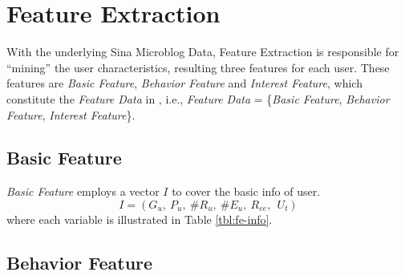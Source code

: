 

\section{Feature Extraction}
\label{sec:fe}

With the underlying Sina Microblog Data, Feature Extraction is responsible for ``mining'' the user characteristics, resulting three features for each user.
These features are \textit{Basic Feature}, \textit{Behavior Feature} and \textit{Interest Feature}, which constitute the \textit{Feature Data} in \sys{}, i.e., \textit{Feature Data} = \{\textit{Basic Feature}, \textit{Behavior Feature}, \textit{Interest Feature}\}.

\subsection{Basic Feature}

\textit{Basic Feature} employs a vector $I$ to cover the basic info of user.
\begin{equation}
\label{eq:info}
	I = (G_u,\ P_u,\ \#R_u,\ \#E_u,\ R_{ee},\ \ U_t)
\end{equation}
where each variable is illustrated in Table \ref{tbl:fe-info}.

\subsection{Behavior Feature}

